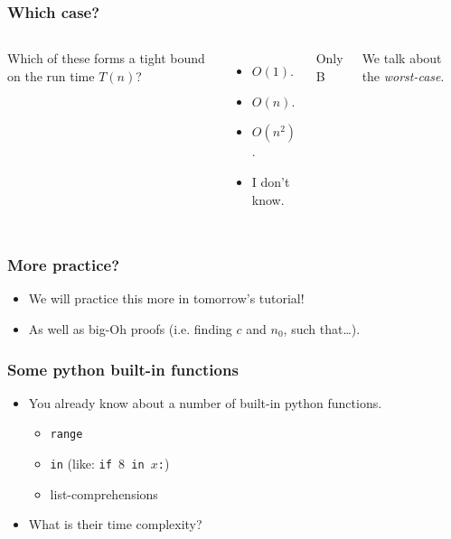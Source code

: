 \begin{frame}
	\frametitle{Which case?}

	
	\begin{columns}
		Which of these forms a tight bound on the run time $T(n)$?
	\begin{itemize}
		\small
		\item $O(1)$. 
		\item $O(n)$. 
		\item $O(n^2)$. 
		\item I don't know.
	\end{itemize}	
			Only B
		
			We talk about the \textit{worst-case}.
	\end{columns}
	
	
	
\end{frame}

\begin{frame}
	\frametitle{More practice?}
	\begin{itemize}
		\item We will practice this more in tomorrow's tutorial!
		\item As well as big-Oh proofs (i.e. finding $c$ and $n_0$, such that\dots).
	\end{itemize}
\end{frame}

\begin{frame}
	\frametitle{Some python built-in functions}
	\begin{itemize}
		\item You already know about a number of built-in python functions.
			\begin{itemize}
				\item \texttt{range}
			
				\item \texttt{in} (like: \texttt{if $8$ in $x$:})
			
				\item list-comprehensions
			\end{itemize}
			
		\item What is their time complexity?
	\end{itemize}	
\end{frame}

